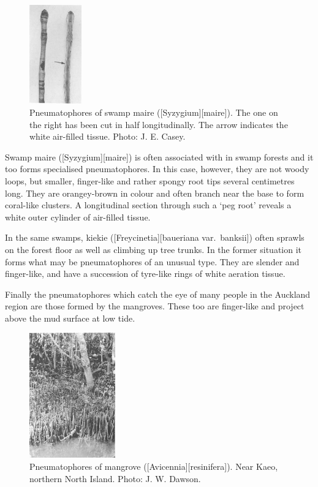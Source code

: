 \begin{figure}
	\includegraphics[width=0.2\textwidth]{graphics/figure12swampmaire.jpg}
	\centering
	\caption[Pneumatophores of swamp maire]{Pneumatophores of swamp maire ([Syzygium][maire]).
	The one on the right has been cut in half longitudinally.
	The arrow indicates the white air-filled tissue.
	Photo:  J. E. Casey.}%
	\label{fig:12swampmaire}
\end{figure}

Swamp maire ([Syzygium][maire]) is often associated with  in swamp forests and it too forms specialised pneumatophores.
In this case, however, they are not woody loops, but smaller, finger-like and rather spongy root tips several centimetres long.
They are orangey-brown in colour and often branch near the base to form coral-like clusters.
A longitudinal section through such a `peg root' reveals a white outer cylinder of air-filled tissue.

In the same swamps, kiekie ([Freycinetia][baueriana var.\ banksii]) often sprawls on the forest floor as well as climbing up tree trunks.
In the former situation it forms what may be pneumatophores of an unusual type.
They are slender and finger-like, and have a succession of tyre-like rings of white aeration tissue.

Finally the pneumatophores which catch the eye of many people in the Auckland region are those formed by the mangroves.
These too are finger-like and project above the mud surface at low tide.

\begin{figure}
	\includegraphics[width=0.33\textwidth]{graphics/figure13mangrove.jpg}
	\centering
	\caption[Pneumatophores of mangrove]{Pneumatophores of mangrove ([Avicennia][resinifera]).
	Near Kaeo, northern North Island.
	Photo:  J. W. Dawson.}%
	\label{fig:13mangrove}
\end{figure}

